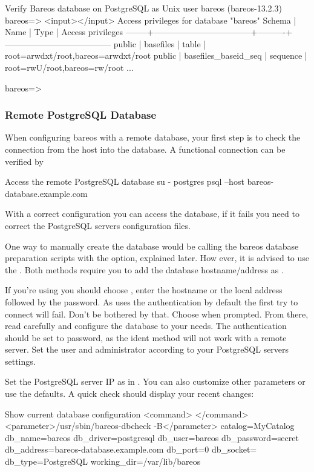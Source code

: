 \begin{commands}{Verify Bareos database on PostgreSQL as Unix user bareos (bareos-13.2.3)}
bareos=> <input>\dp</input>
                 Access privileges for database "bareos"
 Schema |               Name                |   Type   |  Access privileges
--------+-----------------------------------+----------+--------------------------------------
 public | basefiles                         | table    | {root=arwdxt/root,bareos=arwdxt/root}
 public | basefiles_baseid_seq              | sequence | {root=rwU/root,bareos=rw/root}
...

bareos=>
\end{commands}

\subsubsection{Remote PostgreSQL Database}
\label{catalog-maintenance-remote-psql}

When configuring bareos with a remote database, your first step is to check the connection from the \bareosDir host into the database.
A functional connection can be verified by
\begin{commands}{Access the remote PostgreSQL database}
su - postgres
psql --host bareos-database.example.com
\end{commands}
With a correct configuration you can access the database, if it fails you need to correct the PostgreSQL servers configuration files.

One way to manually create the database would be calling the bareos database preparation scripts with the  option, explained later.
How ever, it is advised to use the .
Both methods require you to add the database hostname/address as .

If you're using  you should choose , enter the hostname or the local address followed by the password.
As  uses the  authentication by default the first try to connect will fail. Don't be bothered by that. Choose  when prompted. From there, read carefully and configure the database to your needs.
The authentication should be set to password, as the ident method will not work with a remote server.
Set the user and administrator according to your PostgreSQL servers settings.

Set the PostgreSQL server IP as  in .
You can also customize other parameters or use the defaults. A quick check should display your recent changes:
\begin{commands}{Show current database configuration}
<command> </command><parameter>/usr/sbin/bareos-dbcheck -B</parameter>
catalog=MyCatalog
db_name=bareos
db_driver=postgresql
db_user=bareos
db_password=secret
db_address=bareos-database.example.com
db_port=0
db_socket=
db_type=PostgreSQL
working_dir=/var/lib/bareos
\end{commands}

